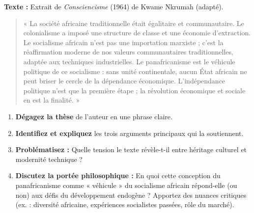 \documentclass[11pt]{article}
\begin{document}
\begin{exercice}
\textbf{Texte :} Extrait de \emph{Consciencisme} (1964) de Kwame Nkrumah (adapté).

\begin{quote}
« La société africaine traditionnelle était égalitaire et communautaire. Le colonialisme a imposé une structure de classe et une économie d'extraction. Le socialisme africain n'est pas une importation marxiste ; c'est la réaffirmation moderne de nos valeurs communautaires traditionnelles, adaptée aux techniques industrielles. Le panafricanisme est le véhicule politique de ce socialisme : sans unité continentale, aucun État africain ne peut briser le cercle de la dépendance économique. L'indépendance politique n'est que la première étape ; la révolution économique et sociale en est la finalité. »
\end{quote}

\begin{enumerate}
\item \textbf{Dégagez la thèse} de l'auteur en une phrase claire.
\item \textbf{Identifiez et expliquez} les trois arguments principaux qui la soutiennent.
\item \textbf{Problématisez :} Quelle tension le texte révèle-t-il entre héritage culturel et modernité technique ?
\item \textbf{Discutez la portée philosophique :} En quoi cette conception du panafricanisme comme « véhicule » du socialisme africain répond-elle (ou non) aux défis du développement endogène ? Apportez des nuances critiques (ex. : diversité africaine, expériences socialistes passées, rôle du marché).
\end{enumerate}
\end{exercice}
\end{document}
